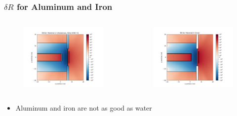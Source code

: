 \documentclass[t]{beamer}
\begin{document}
\begin{frame}
  \frametitle{$\delta R$ for Aluminum and Iron}
  \vskip-0.3in
  \begin{columns}
    \begin{figure}
      \includegraphics[trim={0.7in 0.15in 1.05in 0.4in},clip,scale=0.36]{images/dR_02.png}
    \end{figure}
    \begin{figure}
      \includegraphics[trim={0.7in 0.15in 1.05in 0.4in},clip,scale=0.36]{images/dR_08.png}
    \end{figure}
  \end{columns}
  \begin{itemize}
    \item Aluminum and iron are not as good as water
  \end{itemize}
\end{frame}
\end{document}
